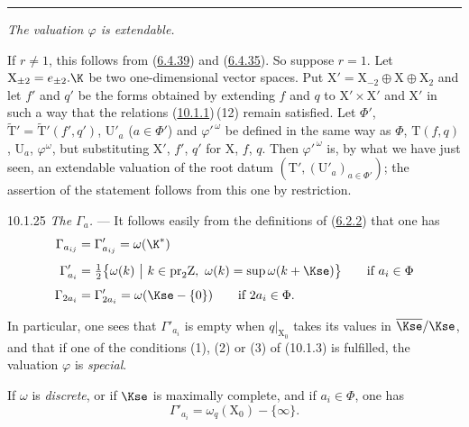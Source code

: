\documentclass[12pt,a4paper,oneside,english]{smfart}
\makeatletter
\newcommand{\btanchor}[1]{\leavevmode\Hy@raisedlink{\hypertarget{bt:#1}{}}}
\newcommand{\btref}[1]{\hyperlink{bt:#1}{#1}}
\theoremstyle{definition}
\theoremstyle{bt}
\makeatother
\begin{document}
\bigskip
\begin{center}\rule{0.5\textwidth}{0.4pt}\end{center}



\btanchor{10.1.24}
\emph{The valuation $\varphi$ is extendable.}

\pf
If $r\neq 1$, this follows from (\btref{6.4.39}) and (\btref{6.4.35}). So suppose $r=1$. Let
$\mathrm{X}_{\pm 2}=e_{\pm 2}.\K$ be two one-dimensional vector spaces. Put
$\mathrm{X}'=\mathrm{X}_{-2}\oplus \mathrm{X}\oplus \mathrm{X}_{2}$ and let $f'$
and $q'$ be the forms obtained by extending $f$ and $q$ to
$\mathrm{X}'\times \mathrm{X}'$ and $\mathrm{X}'$ in such a way that the
relations (\btref{10.1.1})\,(12) remain satisfied. Let $\Phi'$,
$\widetilde{\mathrm{T}}{}'=\widetilde{\mathrm{T}}{}'(f',q')$, $\mathrm{U}'_a$
($a\in\Phi'$) and $\varphi'^{\,\omega}$ be defined in the same way as $\Phi$,
$\mathrm{T}(f,q)$, $\mathrm{U}_a$, $\varphi^\omega$, but substituting
$\mathrm{X}'$, $f'$, $q'$ for $\mathrm{X}$, $f$, $q$. Then
$\varphi'^{\,\omega}$ is, by what we have just seen, an extendable valuation of
the root datum $(\mathrm{T}',(\mathrm{U}'_a)_{a\in\Phi'})$; the assertion of the
statement follows from this one by restriction.

\num{10.1.25}\btanchor{10.1.25} \emph{The $\Gamma_a$.} --- It follows easily from the definitions
of (\btref{6.2.2}) that one has
\begin{align*}
\Gamma_{a_{ij}} &= \Gamma'_{a_{ij}} = \omega(\K^{*})\\[1ex]
\Gamma'_{a_i} &= \tfrac{1}{2}\bigl\{\omega(k)\ \big|\ k\in \mathrm{pr}_2 \mathrm{Z},\
   \omega(k)=\sup \omega(k+\Kse)\bigr\}
   \qquad\text{if } a_i\in\Phi\\[1ex]
\Gamma_{2a_i} &= \Gamma'_{2a_i} = \omega(\Kse-\{0\})
   \qquad\text{if } 2a_i\in\Phi .
\end{align*}

In particular, one sees that $\Gamma'_{a_i}$ is empty when $q|_{\mathrm{X}_0}$
takes its values in $\overline{\Kse}/\Kse$, and that if one of the conditions
(1), (2) or (3) of (10.1.3) is fulfilled, the valuation $\varphi$ is
\emph{special}.

If $\omega$ is \emph{discrete}, or if $\Kse$ is maximally complete, and if
$a_i\in\Phi$, one has
\[
\Gamma'_{a_i}=\omega_q(\mathrm{X}_0)-\{\infty\}.
\]
\end{document}
